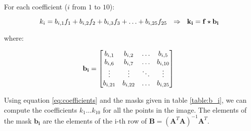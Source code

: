 \documentclass{ipol}
\numberwithin{equation}{section}
\numberwithin{table}{section}
\begin{document}
For each coefficient ($i$ from $1$ to $10$):

\begin{equation}
	\label{eq:coefficients}
	k_i = b_{i,1}f_1 + b_{i,2}f_2 + b_{i,3}f_3 + \hdots + b_{i,25}f_{25} \ \ \Rightarrow \ \ \mathbf{k_i} = \mathbf{f}\star\mathbf{b_i}\\
\end{equation}

where:

\begin{equation}
	\label{eq:b_i}
	\mathbf{b_i} = \begin{bmatrix}	b_{i,1}		& b_{i,2}	& \hdots	& b_{i,5}	\\
									b_{i,6}		& b_{i,7}	& \hdots	& b_{i,10}	\\
									\vdots		& \vdots	& \ddots	& \vdots	\\
									b_{i,21}	& b_{i,22}	& \hdots	& b_{i,25}	\\
					\end{bmatrix}\\
\end{equation}

Using equation \ref{eq:coefficients} and the masks given in table \ref{table:b_i}, we can compute 
the coefficients $k_1 \hdots k_{10}$ for all the points in the image. The elements of the mask $\mathbf{b_i}$ 
are the elements of the i-th row of $\mathbf{B} = (\mathbf{A}^T\mathbf{A})^{-1}\mathbf{A}^T$.\\
\end{document}
